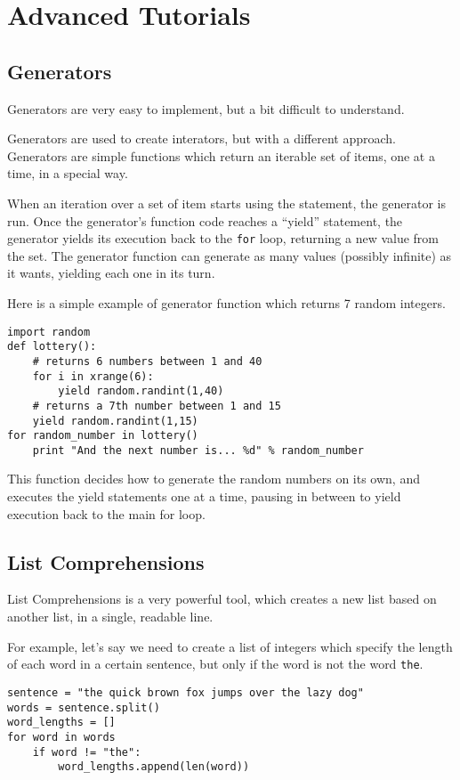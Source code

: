 \documentclass[a4paper,oneside]{book}
\numberwithin{equation}{chapter}
\begin{document}
\chapter{Advanced Tutorials}
\section{Generators}
Generators are very easy to implement, but a bit difficult to understand.

Generators are used to create interators, but with a different approach. Generators are simple functions which return an iterable set of items, one at a time, in a special way.

When an iteration over a set of item starts using the statement, the generator is run. Once the generator's function code reaches a ``yield'' statement, the generator yields its execution back to the \texttt{for} loop, returning a new value from the set. The generator function can generate as many values  (possibly infinite) as it wants, yielding each one in its turn.

Here is a simple example of generator function which returns 7 random integers.
\begin{verbatim}
import random
def lottery():
    # returns 6 numbers between 1 and 40
    for i in xrange(6):
        yield random.randint(1,40)
    # returns a 7th number between 1 and 15
    yield random.randint(1,15)
for random_number in lottery()
    print "And the next number is... %d" % random_number
\end{verbatim}

This function decides how to generate the random numbers on its own, and executes the yield statements one at a time, pausing in between to yield execution back to the main for loop.
\section{List Comprehensions}
List Comprehensions is a very powerful tool, which creates a new list based on another list, in a single, readable line.

For example, let's say we need to create a list of integers which  specify the length of each word in a certain sentence, but only if the word is not the word \texttt{the}.
\begin{verbatim}
sentence = "the quick brown fox jumps over the lazy dog"
words = sentence.split()
word_lengths = [] 
for word in words
    if word != "the":
        word_lengths.append(len(word))
\end{verbatim}
\end{document}
